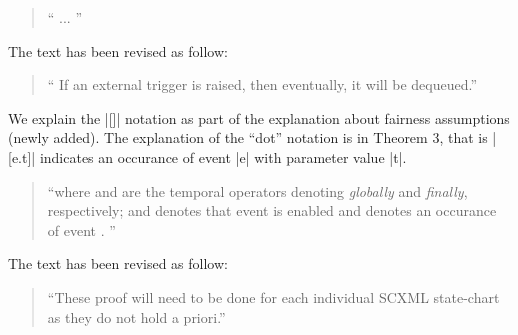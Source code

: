 \documentclass{response}
\begin{document}
\begin{response}
  \begin{quote}
    `` ...
   ''
  \end{quote}
\end{response}

\begin{comment}{Reviewer \#1}
• p.23 typo. it will be dequeued.
\end{comment}

\begin{response}
  The text has been revised as follow:
  \begin{quote}
    `` If an external trigger is raised, then eventually, it will be dequeued.''
  \end{quote}
\end{response}

\begin{comment}{Reviewer \#1}
• p. 23 could you explain the square bracket notation, e.g. [externalTrigger.t]
\end{comment}

\begin{response}
  We explain the |[]| notation as part of the explanation about
  fairness assumptions (newly added). The explanation of the ``dot''
  notation is in Theorem 3, that is |[e.t]| indicates an occurance of
  event |e| with parameter value |t|.
  \begin{quote}
    ``where \mbox{} and \mbox{} are the
  temporal operators denoting \emph{globally} and \emph{finally},
  respectively; and \mbox{} denotes that
  event \mbox{} is enabled and
  \mbox{\EventBInline{[e]}} denotes an occurance of event
  \mbox{}.
   ''
  \end{quote}
\end{response}


\begin{comment}{Reviewer \#1}
• typo. they do no hold a priori.
\end{comment}

\begin{response}
  The text has been revised as follow:
  \begin{quote}
    ``These proof will need to be done for each individual SCXML state-chart as they do not hold a priori.''
  \end{quote}
\end{response}
\end{document}
